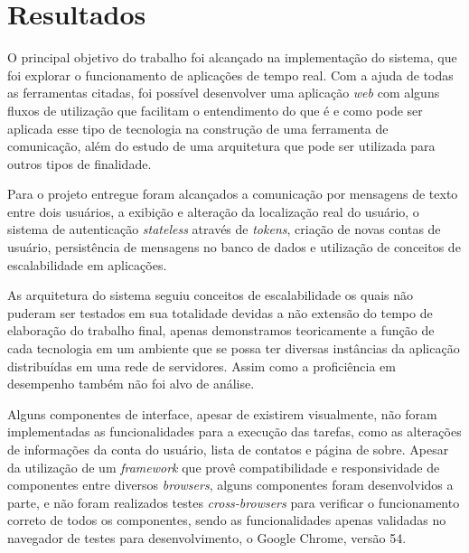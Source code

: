\chapter{Resultados}
O principal objetivo do trabalho foi alcançado na implementação do sistema, que foi explorar o funcionamento de aplicações de tempo real. Com a ajuda de todas as ferramentas citadas, foi possível desenvolver uma aplicação \textit{web} com alguns fluxos de utilização que facilitam o entendimento do que é e como pode ser aplicada esse tipo de tecnologia na construção de uma ferramenta de comunicação, além do estudo de uma arquitetura que pode ser utilizada para outros tipos de finalidade. 

Para o projeto entregue foram alcançados a comunicação por mensagens de texto entre dois usuários, a exibição e alteração da localização real do usuário, o sistema de autenticação \textit{stateless} através de \textit{tokens}, criação de novas contas de usuário, persistência de mensagens no banco de dados e utilização de conceitos de escalabilidade em aplicações. 

As arquitetura do sistema seguiu conceitos de escalabilidade os quais não puderam ser testados em sua totalidade devidas a não extensão do tempo de elaboração do trabalho final, apenas demonstramos teoricamente a função de cada tecnologia em um ambiente que se possa ter diversas instâncias da aplicação distribuídas em uma rede de servidores. Assim como a proficiência em desempenho também não foi alvo de análise.

Alguns componentes de interface, apesar de existirem visualmente, não foram implementadas as funcionalidades para a execução das tarefas, como as alterações de informações da conta do usuário, lista de contatos e página de sobre. Apesar da utilização de um \textit{framework} que provê compatibilidade e responsividade de componentes entre diversos \textit{browsers}, alguns componentes foram desenvolvidos a parte, e não foram realizados testes \textit{cross-browsers} para verificar o funcionamento correto de todos os componentes, sendo as funcionalidades apenas validadas no navegador de testes para desenvolvimento, o Google Chrome, versão 54.